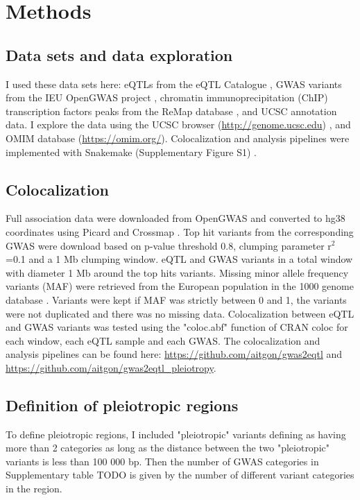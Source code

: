\section*{Methods}\label{sec:methods}

\subsection*{Data sets and data exploration}

I used these data sets here: eQTLs from the eQTL Catalogue \citep{2021.Alasoo.Kerimov}, GWAS variants from the IEU OpenGWAS project \citep{2021.Marcora.Lyon}, chromatin immunoprecipitation (ChIP) transcription factors peaks from the ReMap database \citep{2021.Ballester.Hammal}, and UCSC annotation data.
%
I explore the data using the UCSC browser (\url{http://genome.ucsc.edu}) \citep{2021.Kent.Lee}, and OMIM database (\url{https://omim.org/}).
%
Colocalization and analysis pipelines were implemented with Snakemake (Supplementary Figure S1) .

\subsection*{Colocalization}

Full association data were downloaded from OpenGWAS and converted to hg38 coordinates using Picard and Crossmap \citep{2021.Marcora.Lyon,Picard2019toolkit,2013.Wang.Zhao}.
%
Top hit variants from the corresponding GWAS were download based on p-value threshold 0.8, clumping parameter r$^2$=0.1 and a 1 Mb clumping window.
%
eQTL and GWAS variants in a total window with diameter 1 Mb around the top hits variants.
%
Missing minor allele frequency variants (MAF) were retrieved from the European population in the 1000 genome database \citep{2015.Abecasis.Auton}.
%
Variants were kept if MAF was strictly between 0 and 1, the variants were not duplicated and there was no missing data.
%
Colocalization between eQTL and GWAS variants was tested using the "coloc.abf" function of CRAN coloc for each window, each eQTL sample and each GWAS.
%
The colocalization and analysis pipelines can be found here: \url{https://github.com/aitgon/gwas2eqtl} and \url{https://github.com/aitgon/gwas2eqtl_pleiotropy}.

\subsection*{Definition of pleiotropic regions}

To define pleiotropic regions, I included "pleiotropic" variants defining as having more than 2 categories as long as the distance between the two "pleiotropic" variants is less than 100 000 bp.
%
Then the number of GWAS categories in Supplementary table TODO is given by the number of different variant categories in the region.

